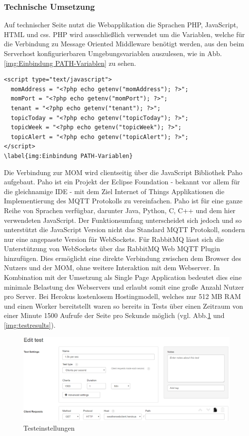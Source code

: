 \subsubsection{Technische Umsetzung}
Auf technischer Seite nutzt die Webapplikation die Sprachen PHP, JavaScript, HTML und css. PHP wird ausschließlich verwendet um die Variablen, welche für die Verbindung zu Message Oriented Middleware benötigt werden, aus den beim Serverhost konfigurierbaren Umgebungsvariablen auszulesen, wie in Abb.\ref{img:Einbindung PATH-Variablen} zu sehen.
\begin{lstlisting} 
<script type="text/javascript">
  momAddress = "<?php echo getenv("momAddress"); ?>";
  momPort = "<?php echo getenv("momPort"); ?>";
  tenant = "<?php echo getenv("tenant"); ?>";
  topicToday = "<?php echo getenv("topicToday"); ?>";
  topicWeek = "<?php echo getenv("topicWeek"); ?>";
  topicAlert = "<?php echo getenv("topicAlert"); ?>";
</script>
\label{img:Einbindung PATH-Variablen}
\end{lstlisting}
Die Verbindung zur MOM wird clientseitig über die JavaScript Bibliothek Paho aufgebaut. Paho ist ein Projekt der Eclipse Foundation - bekannt vor allem für die gleichnamige IDE - mit dem Ziel Internet of Things Applikationen die Implementierung des MQTT Protokolls zu vereinfachen. Paho ist für eine ganze Reihe von Sprachen verfügbar, darunter Java, Python, C, C++ und dem hier verwendeten JavaScript. Der Funktionsumfang unterscheidet sich jedoch und so unterstützt die JavaScript Version nicht das Standard MQTT Protokoll, sondern nur eine angepasste Version für WebSockets. Für RabbitMQ lässt sich die Unterstützung von WebSockets über das RabbitMQ Web MQTT Plugin hinzufügen. Dies ermöglicht eine direkte Verbindung zwischen dem Browser des Nutzers und der MOM, ohne weitere Interaktion mit dem Webserver.
In Kombination mit der Umsetzung als Single Page Application bedeutet dies eine minimale Belastung des Webservers und erlaubt somit eine große Anzahl Nutzer pro Server. Bei Herokus kostenlosem Hostingmodell, welches nur 512 MB RAM und einen Worker bereitstellt waren so bereits in Tests über einen Zeitraum von einer Minute 1500 Aufrufe der Seite pro Sekunde möglich (vgl. Abb.\ref{img:testsettings} und \ref{img:testresults}).
\begin{figure}[htbp]
	\centering
	\includegraphics[width=1.0\textwidth]{Bilder/Web-TestSettings.png}
	\caption{Testeinstellungen}
	\label{img:testsettings}
\end{figure}
